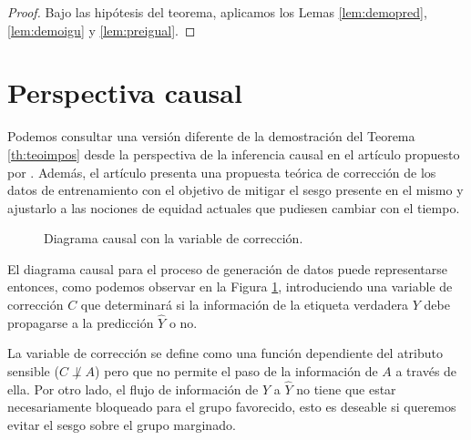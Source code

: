 \documentclass[oneside,openright,titlepage,numbers=noenddot,openany,headinclude,footinclude=true,
cleardoublepage=empty,abstractoff,BCOR=5mm,paper=a4,fontsize=12pt,main=spanish]{scrreprt}
\begin{document}
\begin{proof}
Bajo las hipótesis del teorema, aplicamos los Lemas \ref{lem:demopred}, \ref{lem:demoigu} y \ref{lem:preigual}.
\end{proof}

\section{Perspectiva causal} \label{sec:saravaku}

Podemos consultar una versión diferente de la demostración del Teorema \ref{th:teoimpos} desde la perspectiva de la inferencia causal en el artículo propuesto por \cite{impossibilityth2021}. Además, el artículo presenta una propuesta teórica de corrección de los datos de entrenamiento con el objetivo de mitigar el sesgo presente en el mismo y ajustarlo a las nociones de equidad actuales que pudiesen cambiar con el tiempo.\\

\begin{figure}[h]
\centering
{}
\caption{Diagrama causal con la variable de corrección.}
\label{fig:varcorrect}
\end{figure}

El diagrama causal para el proceso de generación de datos puede representarse entonces, como podemos observar en la Figura \ref{fig:varcorrect}, introduciendo una variable de corrección $C$ que determinará si la información de la etiqueta verdadera $Y$ debe propagarse a la predicción $\hat{Y}$ o no. 

La variable de corrección se define como una función dependiente del atributo sensible ($C \not\perp A$) pero que no permite el paso de la información de $A$ a través de ella. Por otro lado, el flujo de información de $Y$ a $\hat{Y}$ no tiene que estar necesariamente bloqueado para el grupo favorecido, esto es deseable si queremos evitar el sesgo sobre el grupo marginado.\\
\end{document}
